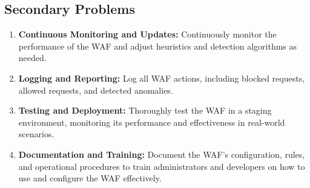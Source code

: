 \documentclass[a4paper, onecolumn, 12pt]{IEEEtran}
\begin{document}
\subsection{Secondary Problems}
\begin{enumerate}
    \item \textbf{Continuous Monitoring and Updates:}
        Continuously monitor the performance of the WAF and adjust heuristics and detection algorithms as needed.

    \item \textbf{Logging and Reporting:}
        Log all WAF actions, including blocked requests, allowed requests, and detected anomalies.

    \item \textbf{Testing and Deployment:}
        Thoroughly test the WAF in a staging environment, monitoring its performance and effectiveness in real-world scenarios.

    \item \textbf{Documentation and Training:}
        Document the WAF's configuration, rules, and operational procedures to train administrators and developers on how to use and configure the WAF effectively.

\end{enumerate}

\medskip

\IEEEtriggercmd{\normalsize}

%
%
\end{document}
